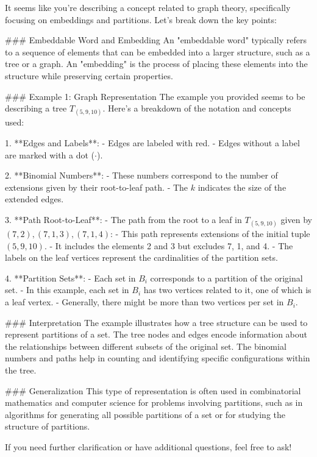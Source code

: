 It seems like you're describing a concept related to graph theory, specifically focusing on embeddings and partitions. Let's break down the key points:

### Embeddable Word and Embedding
An "embeddable word" typically refers to a sequence of elements that can be embedded into a larger structure, such as a tree or a graph. An "embedding" is the process of placing these elements into the structure while preserving certain properties.

### Example 1: Graph Representation
The example you provided seems to be describing a tree \( T_{(5,9,10)} \). Here’s a breakdown of the notation and concepts used:

1. **Edges and Labels**:
   - Edges are labeled with red.
   - Edges without a label are marked with a dot (\(\cdot\)).

2. **Binomial Numbers**:
   - These numbers correspond to the number of extensions given by their root-to-leaf path.
   - The \(k\) indicates the size of the extended edges.

3. **Path Root-to-Leaf**:
   - The path from the root to a leaf in \( T_{(5,9,10)} \) given by \((7,2), (7,1,3), (7,1,4)\):
     - This path represents extensions of the initial tuple \((5,9,10)\).
     - It includes the elements 2 and 3 but excludes 7, 1, and 4.
     - The labels on the leaf vertices represent the cardinalities of the partition sets.

4. **Partition Sets**:
   - Each set in \( B_i \) corresponds to a partition of the original set.
   - In this example, each set in \( B_i \) has two vertices related to it, one of which is a leaf vertex.
   - Generally, there might be more than two vertices per set in \( B_i \).

### Interpretation
The example illustrates how a tree structure can be used to represent partitions of a set. The tree nodes and edges encode information about the relationships between different subsets of the original set. The binomial numbers and paths help in counting and identifying specific configurations within the tree.

### Generalization
This type of representation is often used in combinatorial mathematics and computer science for problems involving partitions, such as in algorithms for generating all possible partitions of a set or for studying the structure of partitions.

If you need further clarification or have additional questions, feel free to ask!